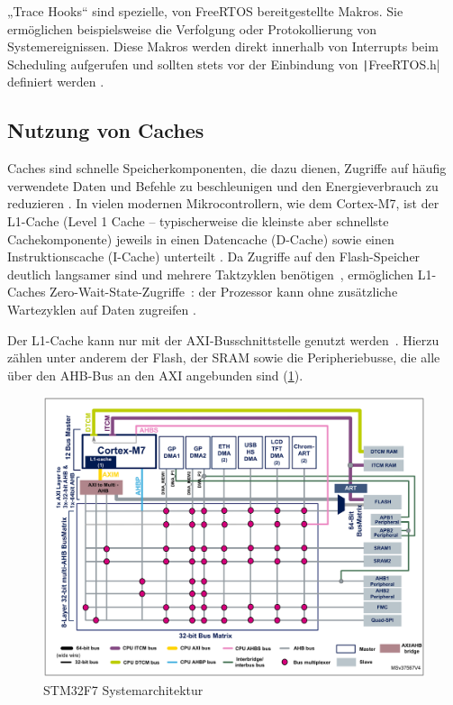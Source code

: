 „Trace Hooks“ sind spezielle, von FreeRTOS bereitgestellte Makros. Sie
ermöglichen beispielsweise die Verfolgung oder Protokollierung von
Systemereignissen. Diese Makros werden direkt innerhalb von Interrupts beim
Scheduling aufgerufen und sollten stets vor der Einbindung von
\texttt|FreeRTOS.h| definiert werden \cite{freertos_rtos_trace_hooks}.

\subsection{Nutzung von Caches}

Caches sind schnelle Speicherkomponenten, die dazu dienen, Zugriffe auf häufig
verwendete Daten und Befehle zu beschleunigen und den Energieverbrauch zu
reduzieren \cite{ka001150}. In vielen modernen Mikrocontrollern, wie dem
Cortex-M7, ist der L1-Cache (Level 1 Cache -- typischerweise die kleinste aber
schnellste Cachekomponente) jeweils in einen Datencache (D-Cache) sowie einen
Instruktionscache (I-Cache) unterteilt \cite[S. 6]{an4667}. Da Zugriffe auf den
Flash-Speicher deutlich langsamer sind und mehrere Taktzyklen
benötigen~\cite{stm32_memory_sections}, ermöglichen L1-Caches
Zero-Wait-State-Zugriffe~\cite[S. 6]{an4667}: der Prozessor kann ohne
zusätzliche Wartezyklen auf Daten zugreifen \cite{waitstate_wiki}.

Der L1-Cache kann nur mit der \ac{AXI}-Busschnittstelle genutzt werden~\cite[S.
4]{an4839}. Hierzu zählen unter anderem der Flash, der \ac{SRAM} sowie die
Peripheriebusse, die alle über den \ac{AHB}-Bus an den AXI angebunden sind
(\ref{fig:m7_sys_arch}).

\begin{figure}[htb]
    \centering
    \includegraphics[width=1\textwidth]{assets/m7_system_arch}
    \caption{STM32F7 Systemarchitektur \cite[S. 9]{an4667}}
    \label{fig:m7_sys_arch}
\end{figure}

